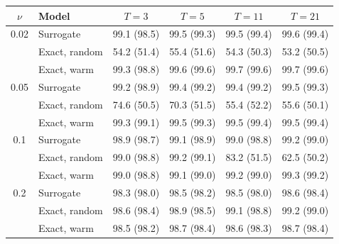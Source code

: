 \begin{tabular}{clcccc}
\toprule
$\nu$ & Model & $T=3$ & $T=5$ & $T=11$ & $T=21$ \\
\midrule
0.02 & Surrogate & 99.1 (98.5) & 99.5 (99.3) & 99.5 (99.4) & 99.6 (99.4) \\
 & Exact, random & 54.2 (51.4) & 55.4 (51.6) & 54.3 (50.3) & 53.2 (50.5) \\
 & Exact, warm & 99.3 (98.8) & 99.6 (99.6) & 99.7 (99.6) & 99.7 (99.6) \\
\midrule
0.05 & Surrogate & 99.2 (98.9) & 99.4 (99.2) & 99.4 (99.2) & 99.5 (99.3) \\
 & Exact, random & 74.6 (50.5) & 70.3 (51.5) & 55.4 (52.2) & 55.6 (50.1) \\
 & Exact, warm & 99.3 (99.1) & 99.5 (99.3) & 99.5 (99.4) & 99.5 (99.4) \\
\midrule
0.1 & Surrogate & 98.9 (98.7) & 99.1 (98.9) & 99.0 (98.8) & 99.2 (99.0) \\
 & Exact, random & 99.0 (98.8) & 99.2 (99.1) & 83.2 (51.5) & 62.5 (50.2) \\
 & Exact, warm & 99.0 (98.8) & 99.1 (99.0) & 99.2 (99.0) & 99.3 (99.2) \\
\midrule
0.2 & Surrogate & 98.3 (98.0) & 98.5 (98.2) & 98.5 (98.0) & 98.6 (98.4) \\
 & Exact, random & 98.6 (98.4) & 98.9 (98.5) & 99.1 (98.8) & 99.2 (99.0) \\
 & Exact, warm & 98.5 (98.2) & 98.7 (98.4) & 98.6 (98.3) & 98.7 (98.4) \\
\bottomrule
\end{tabular}
